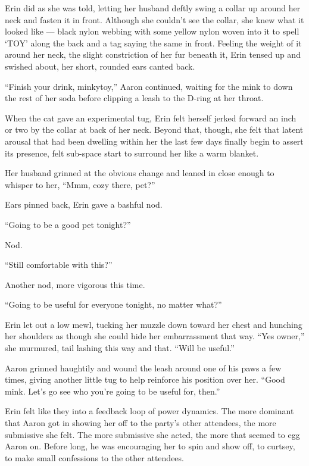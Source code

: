 Erin did as she was told, letting her husband deftly swing a collar up around her neck and fasten it in front. Although she couldn't see the collar, she knew what it looked like --- black nylon webbing with some yellow nylon woven into it to spell `TOY' along the back and a tag saying the same in front. Feeling the weight of it around her neck, the slight constriction of her fur beneath it, Erin tensed up and swished about, her short, rounded ears canted back.

``Finish your drink, minkytoy,'' Aaron continued, waiting for the mink to down the rest of her soda before clipping a leash to the D-ring at her throat.

When the cat gave an experimental tug, Erin felt herself jerked forward an inch or two by the collar at back of her neck. Beyond that, though, she felt that latent arousal that had been dwelling within her the last few days finally begin to assert its presence, felt sub-space start to surround her like a warm blanket.

Her husband grinned at the obvious change and leaned in close enough to whisper to her, ``Mmm, cozy there, pet?''

Ears pinned back, Erin gave a bashful nod.

``Going to be a good pet tonight?''

Nod.

``Still comfortable with this?''

Another nod, more vigorous this time.

``Going to be useful for everyone tonight, no matter what?''

Erin let out a low mewl, tucking her muzzle down toward her chest and hunching her shoulders as though she could hide her embarrassment that way. ``Yes owner,'' she murmured, tail lashing this way and that. ``Will be useful.''

Aaron grinned haughtily and wound the leash around one of his paws a few times, giving another little tug to help reinforce his position over her. ``Good mink. Let's go see who you're going to be useful for, then.''

Erin felt like they into a feedback loop of power dynamics. The more dominant that Aaron got in showing her off to the party's other attendees, the more submissive she felt. The more submissive she acted, the more that seemed to egg Aaron on. Before long, he was encouraging her to spin and show off, to curtsey, to make small confessions to the other attendees.

